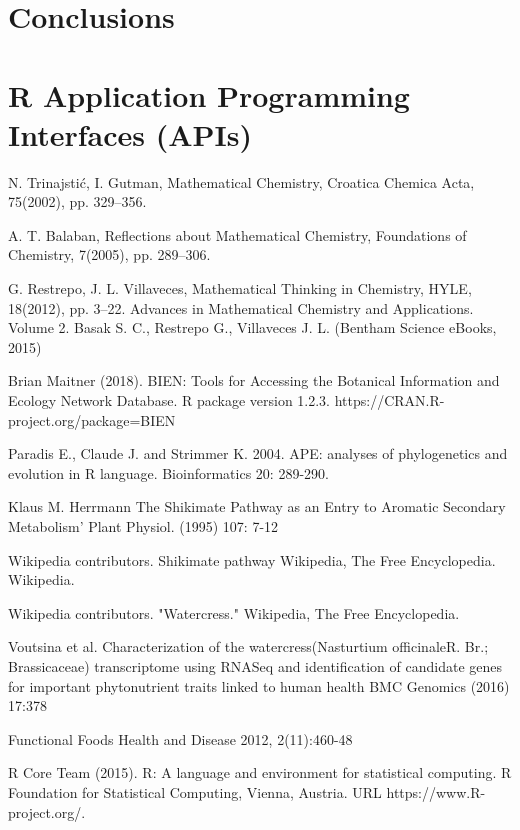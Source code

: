 \section{Conclusions}




\section{R Application Programming Interfaces (APIs)}





\begin{thebibliography}{00}

N. Trinajstić, I. Gutman, 
\newblock Mathematical Chemistry, 
\newblock Croatica Chemica Acta, 75(2002), pp. 329–356.

A. T. Balaban, 
\newblock Reflections about Mathematical Chemistry, 
\newblock Foundations of Chemistry, 7(2005), pp. 289–306.

G. Restrepo, J. L. Villaveces, 
\newblock Mathematical Thinking in Chemistry, HYLE, 18(2012), pp. 3–22.
\newblock Advances in Mathematical Chemistry and Applications. Volume 2. Basak S. C., Restrepo G., Villaveces J. L. (Bentham Science eBooks, 2015)

Brian Maitner (2018). 
\newblock BIEN: Tools for Accessing the Botanical Information and Ecology
\newblock Network Database. R package version 1.2.3. https://CRAN.R-project.org/package=BIEN

 Paradis E., Claude J. and Strimmer K. 2004. 
\newblock APE: analyses of phylogenetics and evolution in R language. 
\newblock Bioinformatics 20: 289-290.

 Klaus M. Herrmann 
\newblock The Shikimate Pathway as an  Entry to Aromatic Secondary Metabolism' 
\newblock Plant Physiol. (1995) 107: 7-12

 Wikipedia contributors. 
\newblock Shikimate pathway 
\newblock Wikipedia, The Free Encyclopedia. Wikipedia. 

Wikipedia contributors. 
\newblock "Watercress." 
\newblock Wikipedia, The Free Encyclopedia. 

 Voutsina et al.
\newblock Characterization of the watercress(Nasturtium officinaleR. Br.; Brassicaceae) transcriptome using RNASeq and
identification of candidate genes for important phytonutrient traits linked to human health
\newblock BMC Genomics (2016) 17:378 

\newblock Functional Foods 
\newblock Health and Disease 2012, 2(11):460-48

R Core Team (2015). 
\newblock R: A language and environment for statistical computing. R Foundation for Statistical Computing, Vienna, Austria.
\newblock URL https://www.R-project.org/.

\end{thebibliography}

